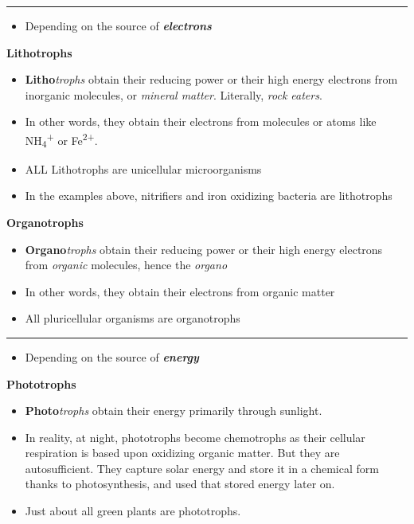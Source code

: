 \documentclass[]{book}
\providecommand{\tightlist}{%
  \setlength{\itemsep}{0pt}\setlength{\parskip}{0pt}}
\theoremstyle{definition}
\theoremstyle{definition}
\theoremstyle{definition}
\theoremstyle{remark}
\begin{document}
\begin{center}\rule{0.5\linewidth}{\linethickness}\end{center}

\begin{itemize}
\tightlist
\item
  Depending on the source of \emph{\textbf{electrons}}
\end{itemize}

\textbf{Lithotrophs}

\begin{itemize}
\tightlist
\item
  \textbf{Litho}\emph{trophs} obtain their reducing power or their high
  energy electrons from inorganic molecules, or \emph{mineral matter}.
  Literally, \emph{rock eaters}.
\item
  In other words, they obtain their electrons from molecules or atoms
  like NH\textsubscript{4}\textsuperscript{+} or Fe\textsuperscript{2+}.
\item
  ALL Lithotrophs are unicellular microorganisms
\item
  In the examples above, nitrifiers and iron oxidizing bacteria are
  lithotrophs
\end{itemize}

\textbf{Organotrophs}

\begin{itemize}
\tightlist
\item
  \textbf{Organo}\emph{trophs} obtain their reducing power or their high
  energy electrons from \emph{organic} molecules, hence the
  \emph{organo}\\
\item
  In other words, they obtain their electrons from organic matter
\item
  All pluricellular organisms are organotrophs 
\end{itemize}

\begin{center}\rule{0.5\linewidth}{\linethickness}\end{center}

\begin{itemize}
\tightlist
\item
  Depending on the source of \emph{\textbf{energy}}
\end{itemize}

\textbf{Phototrophs}

\begin{itemize}
\tightlist
\item
  \textbf{Photo}\emph{trophs} obtain their energy primarily through
  sunlight.
\item
  In reality, at night, phototrophs become chemotrophs as their cellular
  respiration is based upon oxidizing organic matter. But they are
  autosufficient. They capture solar energy and store it in a chemical
  form thanks to photosynthesis, and used that stored energy later on.
\item
  Just about all green plants are phototrophs.
\end{itemize}
\end{document}
